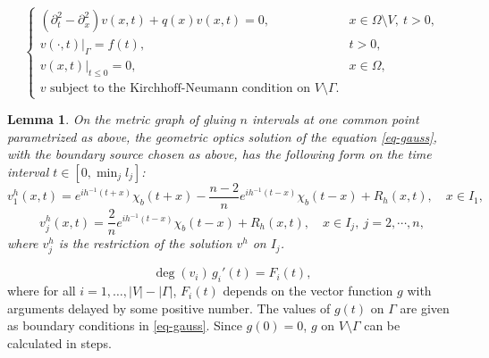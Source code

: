 \documentclass[10pt,a4paper]{amsart}
\newtheorem{lemma}{Lemma}
\begin{document}
\begin{equation}
    \begin{cases}
    (\partial_{t}^2 -\partial_x^2 ) v(x,t)+q(x) v(x,t)=0, &x\in \Omega \setminus V, \  t > 0,\\    v(\cdot,t)|_{\Gamma}=f(t), & t> 0,\\
          v(x,t)|_{t\leq 0}=0, &x\in \Omega,\\
    v \textrm{ subject to the Kirchhoff-Neumann condition on } V\setminus\Gamma.
    \end{cases}
\end{equation}

\begin{lemma} \label{CGO-Y}
On the metric graph of gluing $n$ intervals at one common point parametrized as above, the geometric optics solution of the equation \eqref{eq-gauss}, with the boundary source chosen as above, has the following form on the time interval $t\in [0,\min_{j} l_j]$:
\begin{equation}
    v_1^h(x,t)= e^{ih^{-1}(t+x)}\chi_b(t+x) - \frac{n-2}{n} e^{ih^{-1}(t-x)}\chi_b(t-x) +R_h(x,t), \quad x\in I_1, 
\end{equation}
\begin{equation}
    v_j^h(x,t)= \frac{2}{n} e^{ih^{-1}(t-x)}\chi_b(t-x) +R_h(x,t), \quad x\in I_j,\  j=2,\cdots, n,
\end{equation}
where $v_j^h$ is the restriction of the solution $v^h$ on $I_j$.
\end{lemma}

\begin{equation} \label{splitgroup}
\deg(v_i)\, g_i'(t) =F_i(t),
\end{equation}
 where for all $i=1, \dots, |V|-|\Gamma|$, $F_i(t)$ depends on the vector function $g$ with arguments delayed by some positive number. 
 The values of $g(t)$ on $\Gamma$ are given as boundary conditions in \eqref{eq-gauss}. Since $g(0)=0$, $g$ on $V \setminus \Gamma$ can be calculated in steps. 
 
 
\end{document}
